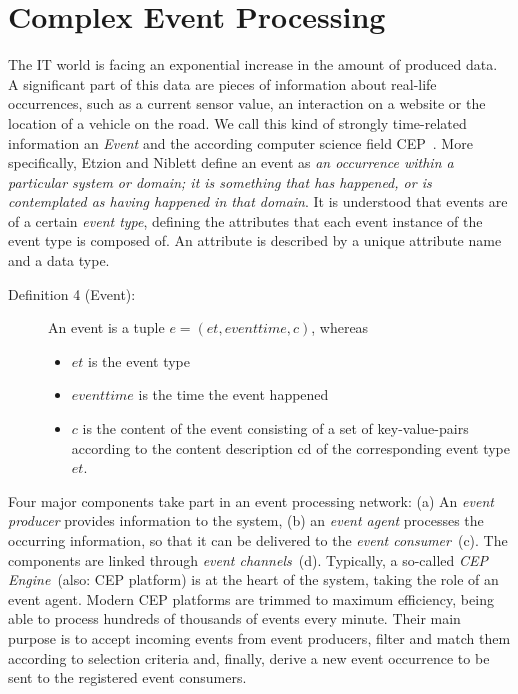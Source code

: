 \section{Complex Event Processing}\label{ch:bg:cep}
The IT world is facing an exponential increase in the amount of produced data. A significant part of this data are pieces of information about real-life occurrences, such as a current sensor value, an interaction on a website or the location of a vehicle on the road.
We call this kind of strongly time-related information an \textit{Event} and the according computer science field \acf{CEP}~\cite{evtprocessing}.
More specifically, Etzion and Niblett define an event as \textit{an occurrence within a particular system or domain; it is something that has happened, or is contemplated as having happened in that domain}.
It is understood that events are of a certain \textit{event type}, defining the attributes that each event instance of the event type is composed of. An attribute is described by a unique attribute name and a data type.

\begin{description}
	\item[Definition 4 (Event):]
	An event is a tuple $e = (et, eventtime, c)$, whereas
	\begin{itemize} 
		\item
		$et$ is the event type
		\item 
		$eventtime$ is the time the event happened
		\item
		$c$ is the content of the event consisting of a set of key-value-pairs according to the content description cd of the corresponding event type $et$.
	\end{itemize}
\end{description}


Four major components take part in an event processing network: (a) An \textit{event producer} provides information to the system, (b) an \textit{event agent} processes the occurring information, so that it can be delivered to the \textit{event consumer}~(c). The components are linked through \textit{event channels}~(d).
Typically, a so-called \textit{\acs{CEP} Engine}~(also: CEP platform) is at the heart of the system, taking the role of an event agent.
Modern CEP platforms are trimmed to maximum efficiency, being able to process hundreds of thousands of events every minute.
Their main purpose is to accept incoming events from event producers, filter and match them according to selection criteria and, finally, derive a new event occurrence to be sent to the registered event consumers.

